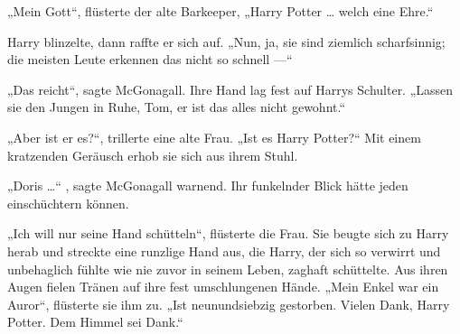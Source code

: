 „Mein Gott“, flüsterte der alte Barkeeper,
„Harry Potter … welch eine Ehre.“

Harry blinzelte, dann raffte er sich auf.
„Nun, ja, sie sind ziemlich scharfsinnig; die meisten Leute erkennen das nicht so schnell —“

„Das reicht“, sagte McGonagall. Ihre Hand lag fest auf Harrys Schulter.
„Lassen sie den Jungen in Ruhe, Tom, er ist das alles nicht gewohnt.“

„Aber ist er es?“, trillerte eine alte Frau.
„Ist es Harry Potter?“ Mit einem kratzenden Geräusch erhob sie sich aus ihrem Stuhl.

„Doris …“ , sagte McGonagall warnend. Ihr funkelnder Blick hätte jeden einschüchtern können.

„Ich will nur seine Hand schütteln“, flüsterte die Frau. Sie beugte sich zu Harry herab und streckte eine runzlige Hand aus, die Harry, der sich so verwirrt und unbehaglich fühlte wie nie zuvor in seinem Leben, zaghaft schüttelte. Aus ihren Augen fielen Tränen auf ihre fest umschlungenen Hände.
„Mein Enkel war ein Auror“, flüsterte sie ihm zu.
„Ist neunundsiebzig gestorben. Vielen Dank, Harry Potter. Dem Himmel sei Dank.“

